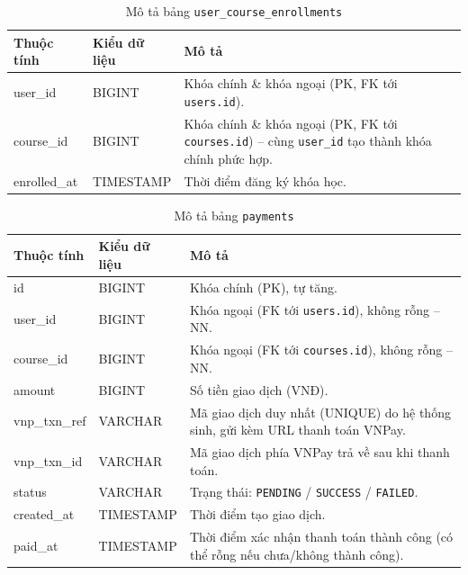 \documentclass[../DoAn.tex]{subfiles}
\begin{document}
\begin{table}[H]
\centering
\small
\renewcommand{\arraystretch}{1.2}
\begin{tabular}{|p{3.2cm}|p{2.4cm}|p{8cm}|}
\hline
\textbf{Thuộc tính} & \textbf{Kiểu dữ liệu} & \textbf{Mô tả} \\ \hline
user\_id & BIGINT & Khóa chính \& khóa ngoại (PK, FK tới \texttt{users.id}). \\ \hline
course\_id & BIGINT & Khóa chính \& khóa ngoại (PK, FK tới \texttt{courses.id}) -- cùng \texttt{user\_id} tạo thành khóa chính phức hợp. \\ \hline
enrolled\_at & TIMESTAMP & Thời điểm đăng ký khóa học. \\ \hline
\end{tabular}
\renewcommand{\arraystretch}{1}
\caption{Mô tả bảng \texttt{user\_course\_enrollments}}
\label{table:db-user-course-enrollments}
\end{table}

\begin{table}[H]
\centering
\small
\renewcommand{\arraystretch}{1.2}
\begin{tabular}{|p{3.2cm}|p{2.4cm}|p{8cm}|}
\hline
\textbf{Thuộc tính} & \textbf{Kiểu dữ liệu} & \textbf{Mô tả} \\ \hline
id & BIGINT & Khóa chính (PK), tự tăng. \\ \hline
user\_id & BIGINT & Khóa ngoại (FK tới \texttt{users.id}), không rỗng -- NN. \\ \hline
course\_id & BIGINT & Khóa ngoại (FK tới \texttt{courses.id}), không rỗng -- NN. \\ \hline
amount & BIGINT & Số tiền giao dịch (VNĐ). \\ \hline
vnp\_txn\_ref & VARCHAR & Mã giao dịch duy nhất (UNIQUE) do hệ thống sinh, gửi kèm URL thanh toán VNPay. \\ \hline
vnp\_txn\_id & VARCHAR & Mã giao dịch phía VNPay trả về sau khi thanh toán. \\ \hline
status & VARCHAR & Trạng thái: \texttt{PENDING} / \texttt{SUCCESS} / \texttt{FAILED}. \\ \hline
created\_at & TIMESTAMP & Thời điểm tạo giao dịch. \\ \hline
paid\_at & TIMESTAMP & Thời điểm xác nhận thanh toán thành công (có thể rỗng nếu chưa/không thành công). \\ \hline
\end{tabular}
\renewcommand{\arraystretch}{1}
\caption{Mô tả bảng \texttt{payments}}
\label{table:db-payments}
\end{table}
\end{document}
